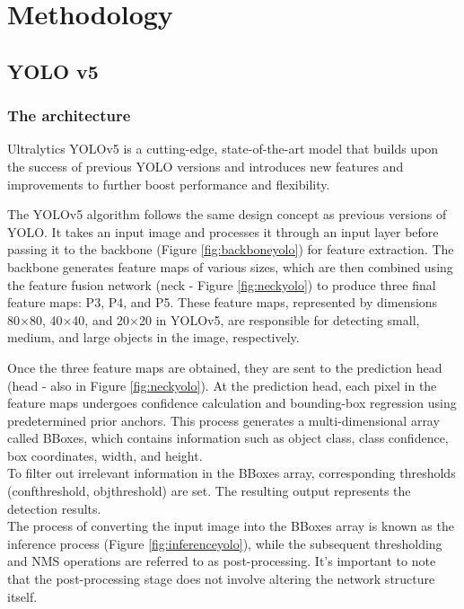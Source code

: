 \section{Methodology}

\subsection{YOLO v5}
\subsubsection{The architecture}
Ultralytics YOLOv5 is a cutting-edge, state-of-the-art model that builds upon the success of previous YOLO versions and introduces new features and improvements to further boost performance and flexibility. \cite{ultralytics}

The YOLOv5 algorithm follows the same design concept as previous versions of YOLO. It takes an input image and processes it through an input layer before passing it to the backbone (Figure \ref{fig:backboneyolo}) for feature extraction. The backbone generates feature maps of various sizes, which are then combined using the feature fusion network (neck - Figure \ref{fig:neckyolo}) to produce three final feature maps: P3, P4, and P5. These feature maps, represented by dimensions 80×80, 40×40, and 20×20 in YOLOv5, are responsible for detecting small, medium, and large objects in the image, respectively.\cite{yolov5}

Once the three feature maps are obtained, they are sent to the prediction head (head - also in Figure \ref{fig:neckyolo}). At the prediction head, each pixel in the feature maps undergoes confidence calculation and bounding-box regression using predetermined prior anchors. This process generates a multi-dimensional array called BBoxes, which contains information such as object class, class confidence, box coordinates, width, and height.\\
To filter out irrelevant information in the BBoxes array, corresponding thresholds (confthreshold, objthreshold) are set. The resulting output represents the detection results.\\ The process of converting the input image into the BBoxes array is known as the inference process (Figure \ref{fig:inferenceyolo}), while the subsequent thresholding and NMS operations are referred to as post-processing. It's important to note that the post-processing stage does not involve altering the network structure itself.\cite{yolov5}

